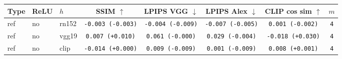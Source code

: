 \begin{tabular}{|l|l|l|c|c|c|c|c|}
\hline
Type & ReLU & $h$ & SSIM $\uparrow$ & LPIPS VGG $\downarrow$ & LPIPS Alex $\downarrow$ & CLIP cos sim $\uparrow$ & $m$ \\
\hline
ref & no & rn152 & \texttt{-0.003 {\color{red}(-0.003)}} & \texttt{-0.004 {\color{green}(-0.009)}} & \texttt{-0.007 {\color{green}(-0.005)}} & \texttt{0.001 {\color{red}(-0.002)}} & \texttt{4} \\
\hline
ref & no & vgg19 & \texttt{0.007 {\color{green}(+0.010)}} & \texttt{0.061 {\color{black}(-0.000)}} & \texttt{0.029 {\color{green}(-0.004)}} & \texttt{-0.018 {\color{green}(+0.030)}} & \texttt{4} \\
\hline
ref & no & clip & \texttt{-0.014 {\color{black}(+0.000)}} & \texttt{0.009 {\color{green}(-0.009)}} & \texttt{0.001 {\color{green}(-0.009)}} & \texttt{0.008 {\color{green}(+0.001)}} & \texttt{4} \\
\hline
\end{tabular}
